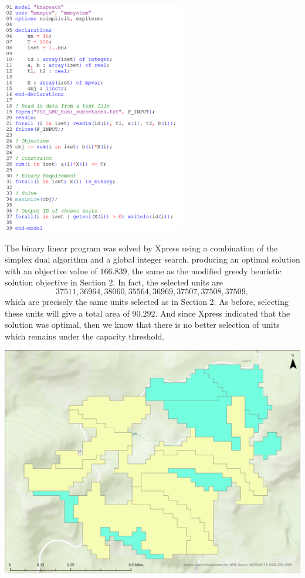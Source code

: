 \documentclass[12pt]{article}
\theoremstyle{definition}
\begin{document}
\begin{center}
    \includegraphics[width=0.6\textwidth]{code2.png}
\end{center}

The binary linear program was solved by Xpress using a combination of the simplex dual algorithm and a global integer search, producing an optimal solution with an objective value of $166.839$, the same as the modified greedy heuristic solution objective in Section 2. In fact, the selected units are
\[
    37511, 36964, 38060, 35564, 36969, 37507, 37508, 37509,
\]
which are precisely the same units selected as in Section 2. As before, selecting these units will give a total area of $90.292$. And since Xpress indicated that the solution was optimal, then we know that there is no better selection of units which remains under the capacity threshold.

\begin{center}
    \includegraphics[width=\textwidth]{map2.png}
\end{center}
\end{document}
